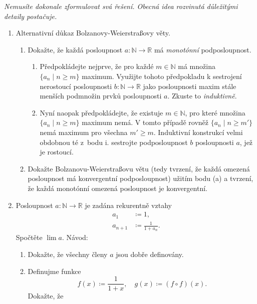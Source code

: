 \documentclass[a4paper,11pt]{article}
\newcommand{\R}{\mathbb{R}}
\newcommand{\N}{\mathbb{N}}
\begin{document}
 \begin{tcolorbox}[breakable,title=\textsf{Těžké úlohy a důkazy (12
  bodů)},arc=0mm,boxsep=3mm,bottomrule=1pt,toprule=1pt,leftrule=-0.1mm,
  rightrule=-0.1mm,colframe=BrickRed!80!white,colback=BrickRed!5!white]
  \emph{Nemusíte dokonale zformulovat svá řešení. Obecná idea rozvinutá
  důležitými detaily postačuje.}
  \begin{enumerate}
   \item Alternativní důkaz Bolzanovy-Weierstraßovy věty.
   \begin{enumerate}
    \item Dokažte, že každá posloupnost $a:\N \to \R$ má \emph{monotónní}
     podposloupnost.
    \begin{enumerate}
     \item Předpokládejte nejprve, že pro každé $m \in \N$ má množina $\{a_n
      \mid n \geq m\}$ maximum. Využijte tohoto předpokladu k sestrojení
      nerostoucí posloupnosti $b:\N \to \R$ jako posloupnosti maxim stále
      menších podmnožin prvků posloupnosti $a$. Zkuste to \emph{induktivně}.
     \item Nyní naopak předpokládejte, že existuje $m \in \N$, pro které množina
      $\{a_n \mid n \geq m\}$ maximum nemá. V tomto případě rovněž $\{a_n \mid
      n \geq m'\}$ nemá maximum pro všechna $m' \geq m$. Induktivní konstrukcí
      velmi obdobnou té z~bodu i. sestrojte podposloupnost $b$ posloupnosti $a$,
      jež je rostoucí.
    \end{enumerate}
   \item Dokažte Bolzanovu-Weierstraßovu větu (tedy tvrzení, že každá omezená
    posloupnost má konvergentní podposloupnost) užitím bodu (a) a tvrzení, že
    každá monotónní omezená posloupnost je konvergentní.
   \end{enumerate}
  \item Posloupnost $a:\N \to \R$ je zadána rekurentně vztahy
   \begin{align*}
    a_1 & \coloneqq 1,\\
    a_{n+1} & \coloneqq \frac{1}{1+a_n}.
   \end{align*}
   Spočtěte $\lim a$. Návod:
   \begin{enumerate}
    \item Dokažte, že všechny členy $a$ jsou dobře definovány.
    \item Definujme funkce
     \[
      f(x) \coloneqq \frac{1}{1+x}, \quad g(x) \coloneqq (f \circ f)(x).
     \]
     Dokažte, že
     \begin{itemize}

\end{itemize}
\end{enumerate}
\end{enumerate}
\end{tcolorbox}
\end{document}
